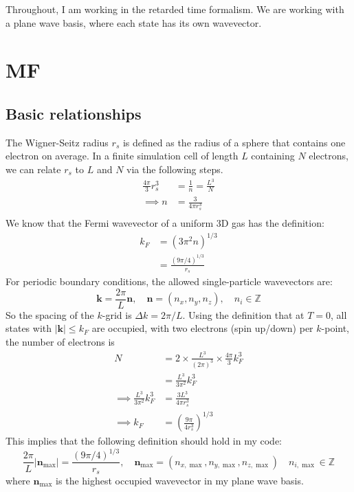 Throughout, I am working in the retarded time formalism. We are working with a plane wave basis, where each state has its own wavevector.
\section{MF}
\subsection{Basic relationships}
The Wigner-Seitz radius $r_s$ is defined as the radius of a sphere that contains one electron on average. In a finite simulation cell of length $L$ containing $N$ electrons, we can relate $r_s$ to $L$ and $N$ via the following steps.
\begin{align}
    \frac{4 \pi}{3} r_s^3&=\frac{1}{n}=\frac{L^3}{N}\\
\implies n&=\frac{3}{4 \pi r_s^3} \\
\end{align}
We know that the Fermi wavevector of a uniform 3D gas has the definition:
\begin{align}
    k_F&=\left(3 \pi^2 n\right)^{1 / 3}\\
&=\frac{(9 \pi / 4)^{1 / 3}}{r_s}
\end{align}
For periodic boundary conditions, the allowed single-particle wavevectors are:
\begin{equation}
    \mathbf{k}=\frac{2 \pi}{L} \mathbf{n}, \quad \mathbf{n}=\left(n_x, n_y, n_z\right), \quad n_i \in \mathbb{Z}
\end{equation}
So the spacing of the $k$-grid is $\Delta k=2 \pi / L$. Using the definition that at $T=0$, all states with $|\mathbf{k}| \leq k_F$ are occupied, with two electrons (spin up/down) per $k$-point, the number of electrons is
\begin{align}
    N&=2 \times \frac{L^3}{(2 \pi)^3} \times \frac{4 \pi}{3} k_F^3\\
&= \frac{L^3}{3 \pi^2} k_F^3 \\
\implies \frac{L^3}{3 \pi^2} k_F^3 &= \frac{3 L^3}{4 \pi r_s^3} \\
\implies k_F &= \left(\frac{9 \pi}{4 r_s^3}\right)^{1 / 3}
\end{align}
This implies that the following definition should hold in my code:
\begin{equation}
    \frac{2 \pi}{L}\left|\mathbf{n}_{\max }\right|=\frac{(9 \pi / 4)^{1 / 3}}{r_s}, \quad \mathbf{n}_{\max }=\left(n_{x, \max }, n_{y, \max }, n_{z, \max }\right) \quad n_{i, \max } \in \mathbb{Z}
\end{equation}
where $\mathbf{n}_{\max }$ is the highest occupied wavevector in my plane wave basis.

